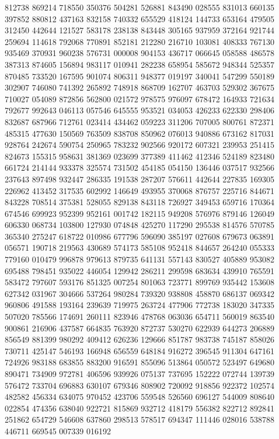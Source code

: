{812738 869214 718550 350376 504281 526881 843490 028555 831013 660135 397852%
880812 437163 832158 740332 655529 418124 144733 653164 479505 312450 442644%
121527 583178 238138 843448 305165 937959 372164 921744 259694 114618 792068%
770891 852181 212280 216710 103081 408333 767130 935469 370931 960238 576731%
000008 904153 436717 066645 058588 486578 387313 874605 156894 983117 010941%
282238 658954 585672 948344 525357 870485 733520 167595 901074 806311 948377%
019197 340041 547299 550189 302907 746080 741392 265892 748918 868709 162707%
463703 529302 367675 710027 054089 872856 562800 021572 978575 976097 678472%
164933 721634 792677 992643 046113 057546 645555 953521 034053 426233 622330%
298406 832687 687966 712761 023414 434462 059223 311206 707005 800761 872371%
485315 477630 150569 763509 838708 850962 076013 940886 673162 817031 928764%
242674 590754 250965 783232 902566 920172 607321 239953 251415 824673 155315%
958631 381369 023699 377389 411462 412346 524189 823480 661724 214144 933378%
325574 731502 454185 054150 136446 037517 932566 237643 897498 932447 286335%
191538 287207 576611 442644 227835 169305 226962 413452 317535 602992 146649%
493955 370068 876757 225716 844671 843228 708514 375381 528055 829138 843118%
726927 349453 659716 170364 674546 699923 952399 952161 001742 182115 949208%
576976 879146 126049 606330 068734 103800 127930 074848 425270 117290 295538%
814576 570785 365340 275247 618722 010986 677796 596090 385197 027608 679673%
063891 056571 190718 219563 430689 574173 585108 952418 844657 264240 055333%
779160 010479 996878 979613 879735 641131 557143 830527 405889 953082 695488%
798451 935022 446054 129942 286211 299598 683634 439910 765591 583472 797607%
593176 851325 007254 801063 723771 899769 935442 153608 627342 031967 304666%
537264 980284 739320 938808 458870 686137 069342 960806 491588 193164 239639%
719975 263724 477906 772738 183020 347335 507020 785566 174691 260111 823946%
478768 063036 654711 560019 863540 900861 216906 437587 664835 763920 872737%
530270 622939 644273 206889 856549 881399 980292 409412 626236 129666 851787%
983738 745187 858026 730711 425147 546193 166948 656559 648184 916272 396545%
911304 647161 724926 983188 683855 883200 916591 855096 513864 050572 523497%
649680 890471 734909 972781 406596 939926 075137 737695 152222 072744 139739%
576472 733704 696883 630107 679346 808902 720092 918856 922372 102574 482582%
456334 634075 970452 423706 559548 526560 696127 544009 808640 022854 474356%
638040 922721 815869 932712 418179 556382 822712 892841 251862 654729 546608%
637860 298513 578517 694347 111446 028016 538788 446711 669545 007339 016192%
}

